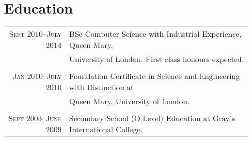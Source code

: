 \documentclass[a4paper,10pt]{article}
\begin{document}
\section{Education}
\begin{tabular}{rl}
  \textsc{Sept} 2010--\textsc{July} 2014 & BSc Computer Science with Industrial Experience, Queen
  Mary,\\& University of London. First class honours expected.\\&\\

  \textsc{Jan} 2010--\textsc{July} 2010 & Foundation Certificate in Science and Engineering with
  Distinction at\\& Queen Mary, University of London.\\&\\

  \textsc{Sept} 2003--\textsc{June} 2009 & Secondary School (O Level) Education at Gray’s
  International College.
\end{tabular}

\end{document}

